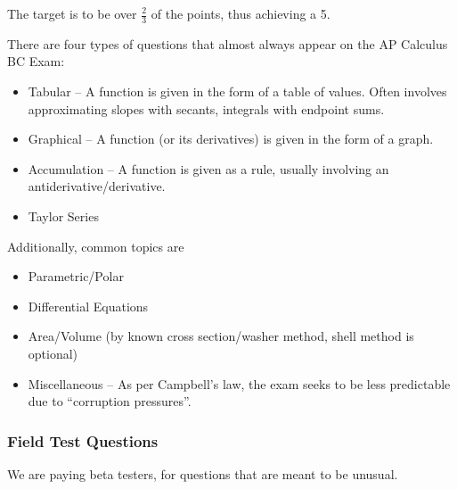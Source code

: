 \documentclass{article}
\begin{document}
The target is to be over $\frac{2}{3}$ of the points, thus achieving a 5.

There are four types of questions that almost always appear on the AP Calculus BC Exam:
\begin{itemize}
    \item Tabular -- A function is given in the form of a table of values. Often involves approximating slopes with secants, integrals with endpoint sums.
    \item Graphical -- A function (or its derivatives) is given in the form of a graph.
    \item Accumulation -- A function is given as a rule, usually involving an antiderivative/derivative.
    \item Taylor Series
\end{itemize}

Additionally, common topics are
\begin{itemize}
    \item Parametric/Polar
    \item Differential Equations
    \item Area/Volume (by known cross section/washer method, shell method is optional)
    \item Miscellaneous -- As per Campbell's law, the exam seeks to be less predictable due to ``corruption pressures''.
\end{itemize}

\subsubsection{Field Test Questions}
We are paying beta testers, for questions that are meant to be unusual.
\end{document}
